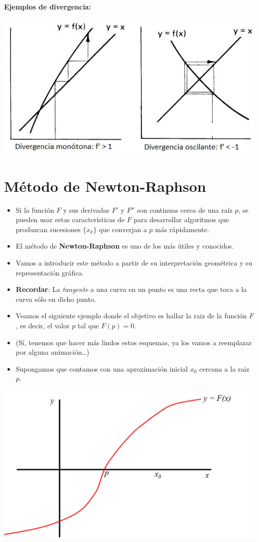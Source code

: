 \documentclass[openany]{book}
\begin{document}
\textbf{Ejemplos de divergencia:}

\begin{center}\includegraphics[width=0.75\linewidth]{Plots/U2/divergencia} \end{center}

\hypertarget{muxe9todo-de-newton-raphson}{%
\section{Método de Newton-Raphson}\label{muxe9todo-de-newton-raphson}}

\begin{itemize}
\item
  Si la función \(F\) y sus derivadas \(F'\) y \(F''\) son continuas cerca de una raíz \(p\), se pueden usar estas características de \(F\) para desarrollar algoritmos que produzcan sucesiones \(\{x_k\}\) que converjan a \(p\) más rápidamente.
\item
  El método de \textbf{Newton-Raphson} es uno de los más útiles y conocidos.
\item
  Vamos a introducir este método a partir de su interpretación geométrica y su representación gráfica.
\item
  \textbf{Recordar}: La \emph{tangente} a una curva en un punto es una recta que toca a la curva sólo en dicho punto.
\item
  Veamos el siguiente ejemplo donde el objetivo es hallar la raiz de la función \(F\), es decir, el valor \(p\) tal que \(F(p) = 0\).
\item
  (Sí, tenemos que hacer más lindos estos esquemas, ya los vamos a reemplazar por alguna animación\ldots{})
\item
  Supongamos que contamos con una aproximación inicial \(x_0\) cercana a la raiz \(p\).
\end{itemize}

\begin{center}\includegraphics[width=0.9\linewidth]{Plots/U2/nr1} \end{center}
\end{document}
